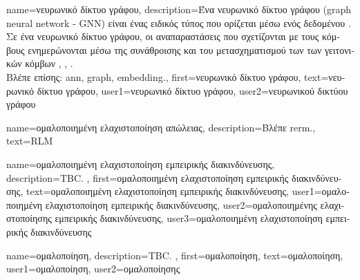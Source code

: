 {name={\foreignlanguage{greek}{νευρωνικό δίκτυο γράφου}},
	description={\foreignlanguage{greek}{Ένα νευρωνικό δίκτυο γράφου} 
		(graph neural network - GNN) \foreignlanguage{greek}{είναι ένας ειδικός τύπος}  \foreignlanguage{greek}{που 
		ορίζεται μέσω ενός δεδομένου} . \foreignlanguage{greek}{Σε ένα νευρωνικό δίκτυο γράφου, 
		οι αναπαραστάσεις που σχετίζονται με τους κόμβους ενημερώνονται μέσω της συνάθροισης και του μετασχηματισμού 
		των}  \foreignlanguage{greek}{των γειτονικών κόμβων} 
		\cite{BishopDeepLearning}, \cite{GeometricDeepLearning2017}, \cite{SSLGCN}.
		\\
		\foreignlanguage{greek}{Βλέπε επίσης:} \gls{ann}, \gls{graph}, \gls{embedding}.},
	first={\foreignlanguage{greek}{νευρωνικό δίκτυο γράφου}},
	text={\foreignlanguage{greek}{νευρωνικό δίκτυο γράφου}},
	user1={\foreignlanguage{greek}{νευρωνικό δίκτυο γράφου}}, %
    	user2={\foreignlanguage{greek}{νευρωνικού δικτύου γράφου}} %
}

{name={\foreignlanguage{greek}{ομαλοποιημένη ελαχιστοποίηση απώλειας}},
 	description={\foreignlanguage{greek}{Βλέπε} \gls{rerm}.},
 	text={RLM}
}

{name={\foreignlanguage{greek}{ομαλοποιημένη ελαχιστοποίηση εμπειρικής διακινδύνευσης}}, 
	description={TBC. }, 
	first={\foreignlanguage{greek}{ομαλοποιημένη ελαχιστοποίηση εμπειρικής διακινδύνευσης}},
	text={\foreignlanguage{greek}{ομαλοποιημένη ελαχιστοποίηση εμπειρικής διακινδύνευσης}}, 
	user1={\foreignlanguage{greek}{ομαλοποιημένη ελαχιστοποίηση εμπειρικής διακινδύνευσης}}, %
  	user2={\foreignlanguage{greek}{ομαλοποιημένης ελαχιστοποίησης εμπειρικής διακινδύνευσης}}, %
	user3={\foreignlanguage{greek}{ομαλοποιημένη ελαχιστοποίηση εμπειρικής διακινδύνευσης}} %
}

{name={\foreignlanguage{greek}{ομαλοποίηση}}, 
	description={TBC. },
	first={\foreignlanguage{greek}{ομαλοποίηση}},
	text={\foreignlanguage{greek}{ομαλοποίηση}},
	user1={\foreignlanguage{greek}{ομαλοποίηση}}, %
	user2={\foreignlanguage{greek}{ομαλοποί\-ησης}} %
}


